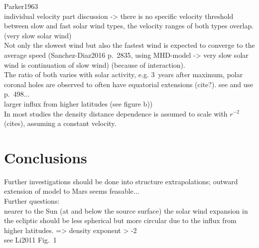 Parker1963\\

individual velocity part discussion -> there is no specific velocity threshold between slow and fast solar wind types, the velocity ranges of both types overlap.\\
\citet{Sanchez-Diaz2016} (very slow solar wind)\\
Not only the slowest wind but also the fastest wind is expected to converge to the average speed (Sanchez-Diaz2016 p.~2835, using MHD-model -> very slow solar wind is continuation of slow wind) (because of interaction).\\

The ratio of both varies with solar activity, e.g. 3~years after maximum, polar coronal holes are observed to often have equatorial extensions (cite?). see and use \citet{Bougeret1984} p.~498...\\

larger influx from higher latitudes (see figure b))\\

In most studies the density distance dependence is assumed to scale with $r^{-2}$ (cites), assuming a constant velocity.\\


\section{Conclusions}

Further investigations should be done into structure extrapolations; outward extension of model to Mars seems feasable...\\

Further questions:\\
nearer to the Sun (at and below the source surface) the solar wind expansion in the ecliptic should be less spherical but more circular due to the influx from higher latitudes. => density exponent > -2\\
see Li2011 Fig.~1\\


